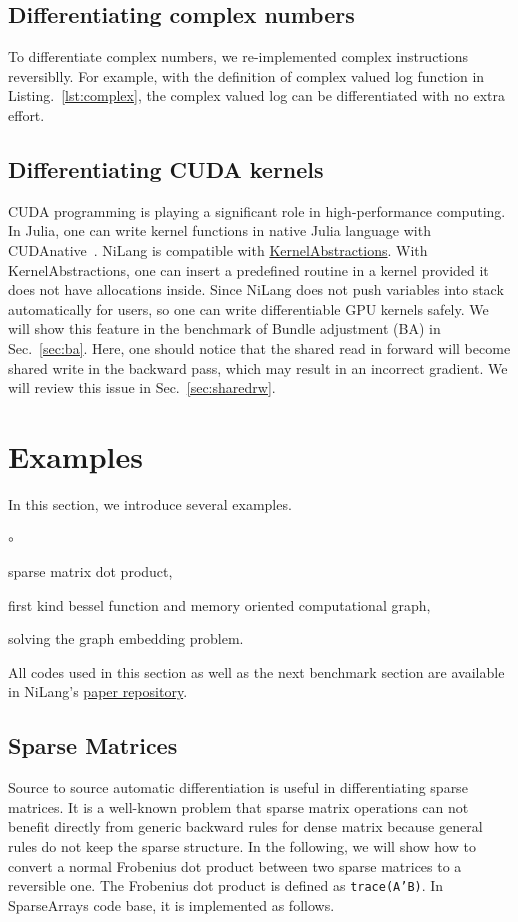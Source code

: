 \documentclass{article}
\newcommand{\<}{\langle}
\renewcommand{\>}{\rangle}
\newcommand{\Lst}[1]{Listing.~\ref{#1}}
\newcommand{\Sec}[1]{Sec.~\ref{#1}}
\theoremstyle{definition}\newtheorem{definition}{\textit{Definition}}
\begin{document}
\subsection{Differentiating complex numbers}
To differentiate complex numbers, we re-implemented complex instructions reversiblly. For example, with the definition of complex valued log function in \Lst{lst:complex}, the complex valued log can be differentiated with no extra effort.

\subsection{Differentiating CUDA kernels}\label{app:cuda}
CUDA programming is playing a significant role in high-performance computing. In Julia, one can write kernel functions in native Julia language with CUDAnative~\cite{Besard2018}.
NiLang is compatible with \href{https://github.com/JuliaGPU/KernelAbstractions.jl}{KernelAbstractions}. With KernelAbstractions, one can insert a predefined routine in a kernel provided it does not have allocations inside.
Since NiLang does not push variables into stack automatically for users, so one can write differentiable GPU kernels safely.
We will show this feature in the benchmark of Bundle adjustment (BA) in \Sec{sec:ba}.
Here, one should notice that the shared read in forward will become shared write in the backward pass, which may result in an incorrect gradient. We will review this issue in \Sec{sec:sharedrw}.

\section{Examples}\label{sec:example}

In this section, we introduce several examples.
\begin{list}{$\circ$}{}
\item sparse matrix dot product,
\item first kind bessel function and memory oriented computational graph,
\item solving the graph embedding problem.
\end{list}

All codes used in this section as well as the next benchmark section are available in NiLang's \href{https://github.com/GiggleLiu/nilangpaper}{paper repository}.

\subsection{Sparse Matrices}
Source to source automatic differentiation is useful in differentiating sparse matrices. It is a well-known problem that sparse matrix operations can not benefit directly from generic backward rules for dense matrix because general rules do not keep the sparse structure.
In the following, we will show how to convert a normal Frobenius dot product between two sparse matrices to a reversible one. The Frobenius dot product is defined as \texttt{trace(A'B)}.
In SparseArrays code base, it is implemented as follows.
\end{document}
